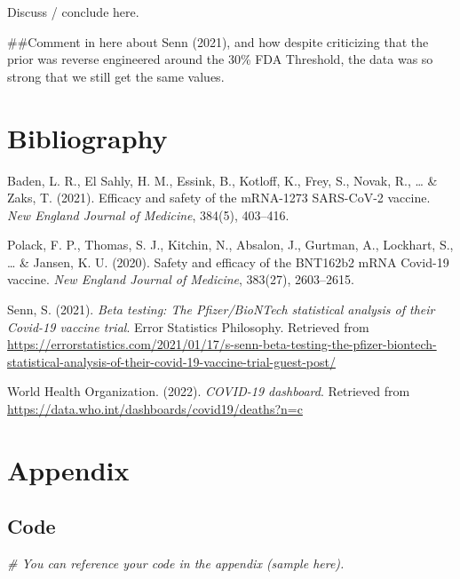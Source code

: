 \documentclass[
  11pt,
]{article}
\newenvironment{Shaded}{\begin{snugshade}}{\end{snugshade}}
\newcommand{\CommentTok}[1]{\textcolor[rgb]{0.56,0.35,0.01}{\textit{#1}}}
\begin{document}
Discuss / conclude here.

\#\#Comment in here about Senn (2021), and how despite criticizing that
the prior was reverse engineered around the 30\% FDA Threshold, the data
was so strong that we still get the same values.

\section{Bibliography}\label{bibliography}

Baden, L. R., El Sahly, H. M., Essink, B., Kotloff, K., Frey, S., Novak,
R., \ldots{} \& Zaks, T. (2021). Efficacy and safety of the mRNA-1273
SARS-CoV-2 vaccine. \emph{New England Journal of Medicine}, 384(5),
403--416.

Polack, F. P., Thomas, S. J., Kitchin, N., Absalon, J., Gurtman, A.,
Lockhart, S., \ldots{} \& Jansen, K. U. (2020). Safety and efficacy of
the BNT162b2 mRNA Covid-19 vaccine. \emph{New England Journal of
Medicine}, 383(27), 2603--2615.

Senn, S. (2021). \emph{Beta testing: The Pfizer/BioNTech statistical
analysis of their Covid-19 vaccine trial}. Error Statistics Philosophy.
Retrieved from
\url{https://errorstatistics.com/2021/01/17/s-senn-beta-testing-the-pfizer-biontech-statistical-analysis-of-their-covid-19-vaccine-trial-guest-post/}

World Health Organization. (2022). \emph{COVID-19 dashboard}. Retrieved
from \url{https://data.who.int/dashboards/covid19/deaths?n=c}

\section{Appendix}\label{appendix}

\subsection{Code}\label{code}

\begin{Shaded}
\begin{Highlighting}[]
\CommentTok{\# You can reference your code in the appendix (sample here).}
\end{Highlighting}
\end{Shaded}
\end{document}
